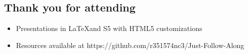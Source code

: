 \documentclass[12pt,notitlepage]{article}
\begin{document}
\begin{s5presentation}
\begin{s5slide}
    \section{Thank you for attending }
    \begin{itemize}
      \item Presentations in \LaTeX and S5 with HTML5 customizations
      \item Resources available at https://github.com/r351574nc3/Just-Follow-Along
      \end{itemize}
    \W \end{s5slide}

\W \end{s5presentation}
\end{document}
